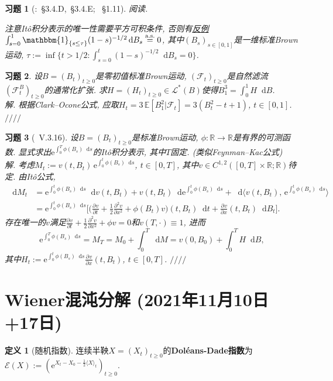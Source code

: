 \documentclass{ctexart}
\theoremstyle{definition}
\newtheorem{Def}{定义}[section]
\theoremstyle{remark}
\theoremstyle{plain}
\newtheorem{Ex}{习题}[section]
\newenvironment{Soln}{\vspace{1ex}\textbf{\\}{\color{red}\textit{解}}.\normalfont}{\color{red}\hfill$/\!/\!/\!/$\vspace{1ex}\par}
\newcommand{\1}{\mathbbm{1}}				%
\newcommand{\as}{\mathrm{a.s.}}				%
\newcommand{\E}{\mathbb{E}}					%
\newcommand{\agp}[1]{\langle #1 \rangle}	%
\newcommand{\R}{\mathbb{R}}					%
\newcommand{\tint}{\textstyle\int\nolimits}
\renewcommand*{\d}{\mathop{}\!\mathrm{d}}	%
\newcommand{\pd}{\partial}					%
\newcommand{\p}[3][]{\frac{\pd^{#1}#2}{\pd{#3}^{#1}}}%
\newcommand{\e}{\mathrm{e}}
\begin{document}
\begin{Ex}[\cite{Karatzas-Shreve--GTM113}:~\S3.4.D,~\S3.4.E; \cite{龚光鲁-钱敏平}~\S1.11]
阅读.\par 注意It\^{o}积分表示的唯一性需要平方可积条件, 否则有\href{https://math.stackexchange.com/a/3707246/469791}{反例}\:$\int_{s=0}^{1} \1_{\{s\le\tau\}} (1-s)^{-1/2} \d B_{s} \stackrel{\as}{=} 0$, 其中$(B_{s})_{s \in [0,1]}$是一维标准Brown运动, $\tau := \inf\{ t > 1/2 : \int_{s=0}^{t} (1-s)^{-1/2} \d B_{s} = 0 \}$.
\end{Ex}


\begin{Ex}
设$B = (B_{t})_{t \ge 0}$是零初值标准Brown运动, $(\mathscr{F}_{t})_{t \ge 0}$是自然滤流$(\mathscr{F}^{B}_{t})_{t \ge 0}$的通常化扩张. 求$H = (H_{t})_{t \ge 0} \in \mathcal{L}^{*}(B)$使得$B_{1}^{3} = \int_{0}^{1} H \d B$.
\begin{Soln}
根据Clark--Ocone公式, 应取$H_{t} = 3\,\E[B_{1}^{2}|\mathscr{F}_{t}] = 3(B_{t}^{2}-t+1)$, $t \in [0,1]$.
\end{Soln}
\end{Ex}


\begin{Ex}[\cite{Revuz-Yor}~V.3.16]
设$B = (B_{t})_{t \ge 0}$是标准Brown运动, $\phi : \R \to \R$是有界的可测函数. 显式求出$\e^{\int_{0}^{T} \phi(B_{s}) \d s}$的It\^{o}积分表示, 其中$T$固定.
\hfill\normalfont (类似Feynman--Kac公式)
\begin{Soln}
考虑$M_{t} := v(t,B_{t}) \, \e^{\int_{0}^{t} \phi(B_{s}) \d s}$, $t \in [0,T]$, 其中$v \in C^{1,2}([0,T]\times\R;\R)$待定. 由It\^{o}公式, 
\[\begin{aligned}
\d M_{t} &= \e^{\int_{0}^{t} \phi(B_{s}) \d s} \d v(t,B_{t}) + v(t,B_{t}) \d \e^{\int_{0}^{t} \phi(B_{s}) \d s} + \d\agp{v(t,B_{t}) ,\, \e^{\int_{0}^{t} \phi(B_{s}) \d s}} \\
&= \e^{\int_{0}^{t} \phi(B_{s}) \d s} \bigg[ \Big( \p{v}{t} + \frac{1}{2}\p[2]{v}{x} + \phi(B_{t})v \Big)(t,B_{t}) \d t + \p{v}{x}(t,B_{t}) \d B_{t} \bigg] .
\end{aligned}\]
存在唯一的$v$满足$\p{v}{t} + \frac{1}{2}\p[2]{v}{x} + \phi v = 0$和$v(T,\bm{\cdot}) \equiv 1$, 进而\[ \e^{\int_{0}^{T} \phi(B_{s}) \d s} = M_{T} = M_{0} + \tint_{0}^{T} \d M = v(0,B_{0}) + \tint_{0}^{T} H \d B , \] 其中$H_{t} := \e^{\int_{0}^{t} \phi(B_{s}) \d s} \p{v}{x}(t,B_{t})$, $t \in [0,T]$.
\end{Soln}
\end{Ex}



\section{Wiener混沌分解 \normalfont\footnotesize (2021年11月10日+17日)}
\begin{Def}[随机指数]
连续半鞅$X = (X_{t})_{t \ge 0}$的\textbf{Dol\'{e}ans-Dade指数}为$\mathcal{E}(X) := (\e^{X_{t}-X_{0}-\frac{1}{2}\agp{X}_{t}})_{t \ge 0}$.
\end{Def}
\end{document}
